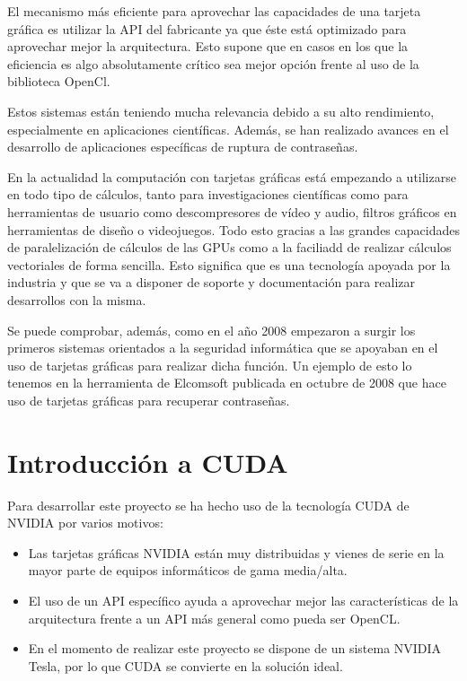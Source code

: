 El mecanismo más eficiente para aprovechar las capacidades de una tarjeta gráfica es utilizar la API del fabricante ya que éste está optimizado para aprovechar mejor la arquitectura. Esto supone que en casos en los que la eficiencia es algo absolutamente crítico sea mejor opción frente al uso de la biblioteca OpenCl.

Estos sistemas están teniendo mucha relevancia debido a su alto rendimiento, especialmente en aplicaciones científicas. Además, se han realizado avances en el desarrollo de aplicaciones específicas de ruptura de contraseñas.

En la actualidad la computación con tarjetas gráficas está empezando a utilizarse en todo tipo de cálculos, tanto para investigaciones científicas  como para herramientas de usuario como descompresores de vídeo y audio, filtros gráficos en herramientas de diseño o videojuegos. Todo esto gracias a las grandes capacidades de paralelización de cálculos de las GPUs como a la faciliadd de realizar cálculos vectoriales de forma sencilla. Esto significa que es una tecnología apoyada por la industria y que se va a disponer de soporte y documentación para realizar desarrollos con la misma.

Se puede comprobar, además, como en el año 2008 empezaron a surgir los primeros sistemas orientados a la seguridad informática que se apoyaban en el uso de tarjetas gráficas para realizar dicha función. Un ejemplo de esto lo tenemos en la herramienta de Elcomsoft publicada en octubre de 2008 \cite{website:elcomsoft_press} que hace uso de tarjetas gráficas para recuperar contraseñas.

\section{Introducción a CUDA}

Para desarrollar este proyecto se ha hecho uso de la tecnología CUDA de NVIDIA por varios motivos:
\begin{itemize}
	\item Las tarjetas gráficas NVIDIA están muy distribuidas y vienes de serie en la mayor parte de equipos informáticos de gama media/alta.
	\item El uso de un API específico ayuda a aprovechar mejor las características de la arquitectura frente a un API más general como pueda ser OpenCL.
	\item En el momento de realizar este proyecto se dispone de un sistema NVIDIA Tesla, por lo que CUDA se convierte en la solución ideal.
\end{itemize}

